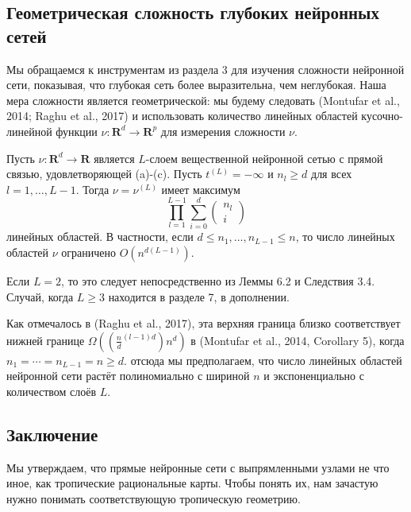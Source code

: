 \documentclass[russian]{lecture-notes}
\begin{document}
		\subsection{Геометрическая сложность глубоких нейронных сетей}
		
		Мы обращаемся к инструментам из раздела 3 для изучения сложности нейронной сети, показывая, что глубокая сеть более выразительна, чем неглубокая. Наша мера сложности является геометрической: мы будему следовать (Montufar et al., 2014;
		Raghu et al., 2017) и использовать количество линейных областей кусочно-линейной функции $\nu : \mathbf{R}^d \rightarrow \mathbf{R}^p$ для измерения сложности $\nu$.
		
		\begin{Theorem}
			Пусть $\nu : \mathbf{R}^d \rightarrow \mathbf{R}$ является $L$-слоем вещественной нейронной сетью с прямой связью, удовлетворяющей (a)-(c). Пусть $t^{(L)} = -\infty$ и $n_l \geq d$ для всех $l = 1,\dots,L-1$. Тогда $\nu = \nu^{(L)}$ имеет максимум
			\[
				\prod\limits_{l=1}^{L-1}\sum\limits_{i = 0}^{d} \begin{pmatrix}
				n_l\\
				i
				\end{pmatrix}
			\]
			линейных областей. В частности, если $d\leq n_1,\dots ,n_{L-1} \leq n$, то число линейных областей $\nu$ ограничено $O(n^{d(L-1)})$.
		\end{Theorem}
		
		\begin{Proof}
			Если $L = 2$, то это следует непосредственно из Леммы 6.2 и Следствия 3.4. Случай, когда $L \geq 3$ находится в разделе 7, в дополнении.
		\end{Proof}
	
	Как отмечалось в (Raghu et al., 2017), эта верхняя граница близко соответствует нижней границе $\Omega ((\frac{n}{d}^{(l-1)d})  n^d)$ в (Montufar et al., 2014, Corollary 5), когда $n_1 = \cdots = n_{L-1} = n \geq d$. отсюда мы предполагаем, что число линейных областей нейронной сети растёт полиномиально с шириной $n$ и экспоненциально с количеством слоёв $L$.
	
	\subsection{Заключение}
	
	Мы утверждаем, что прямые нейронные сети с выпрямленными узлами не что иное, как тропические рациональные карты. Чтобы понять их, нам зачастую нужно понимать соответствующую тропическую геометрию.
	
\end{document}
